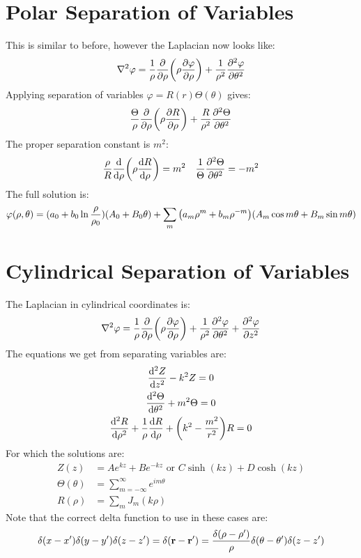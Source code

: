 \documentclass[12pt]{article}
\theoremstyle{plain}
\theoremstyle{definition}
\let\temp\phi
\let\phi\varphi
\let\varphi\temp
\begin{document}
\section{Polar Separation of Variables}
This is similar to before, however the Laplacian now looks like:
\begin{align*}
  \laplacian{\phi}=\frac1\rho\pdv{\rho}\qty(\rho\pdv{\phi}{\rho})
  +\frac1{\rho^2}\pdv[2]{\phi}{\theta}
\end{align*}
Applying separation of variables $\phi=R(r)\Theta(\theta)$ gives:
\begin{align*}
  \frac{\Theta}\rho\pdv\rho\qty(\rho\pdv{R}{\rho})
  +\frac{R}{\rho^2}\pdv[2]{\Theta}{\theta}
\end{align*}
The proper separation constant is $m^2$:
\begin{align*}
  \frac{\rho}{R}\dv{\rho}\qty(\rho\dv{R}{\rho})=m^2\quad
  \frac1{\Theta}\pdv[2]{\Theta}{\theta}=-m^2
\end{align*}
The full solution is:
\begin{align*}
  \phi(\rho,\theta)=(a_0+b_0\ln\frac\rho{\rho_0})(A_0+B_0\theta)
  +\sum_m\qty(a_m\rho^m+b_m\rho^{-m})(A_m\cos m\theta+B_m\sin m\theta)
\end{align*}

\section{Cylindrical Separation of Variables}
The Laplacian in cylindrical coordinates is:
\begin{align*}
  \laplacian{\phi}=\frac1\rho\pdv{\rho}\qty(\rho\pdv{\phi}{\rho})
  +\frac1{\rho^2}\pdv[2]{\phi}{\theta}
  +\pdv[2]{\phi}{z}
\end{align*}
The equations we get from separating variables are:
\begin{gather*}
  \dv[2]{Z}{z}-k^2Z=0\\
  \dv[2]{\Theta}{\theta}+m^2\Theta=0\\
  \dv[2]{R}{\rho}+\frac1\rho\dv{R}{\rho}+\qty(k^2-\frac{m^2}{r^2})R=0
\end{gather*}
For which the solutions are:
\begin{align*}
  Z(z)&=Ae^{kz}+Be^{-kz} \text{ or } C\sinh(kz)+D\cosh(kz)\\
  \Theta(\theta)&=\sum_{m=-\infty}^\infty e^{im\theta}\\
  R(\rho)&=\sum_mJ_m(k\rho)
\end{align*}
Note that the correct delta function to use in these cases are:
\begin{align*}
  \delta(x-x')\delta(y-y')\delta(z-z')=\delta(\vb{r-r}')=
  \frac{\delta(\rho-\rho')}{\rho}\delta(\theta-\theta')\delta(z-z')
\end{align*}
\end{document}
